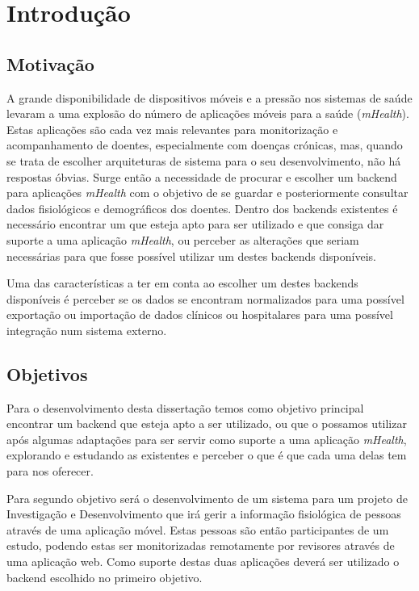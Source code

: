 \chapter{Introdu\c c\~ao}

\section{Motivação}

A grande disponibilidade de dispositivos móveis e a pressão nos sistemas de saúde levaram a uma explosão do número de aplicações móveis para a saúde (\textit{mHealth}). Estas aplicações são cada vez mais relevantes para monitorização e acompanhamento de doentes, especialmente com doenças crónicas, mas, quando se trata de escolher arquiteturas de sistema para o seu desenvolvimento, não há respostas óbvias. Surge então a necessidade de procurar e escolher um backend para aplicações \textit{mHealth} com o objetivo de se guardar e posteriormente consultar dados fisiológicos e demográficos dos doentes.
Dentro dos backends existentes é necessário encontrar um que esteja apto para ser utilizado e que consiga dar suporte a uma aplicação \textit{mHealth}, ou perceber as alterações que seriam necessárias para que fosse possível utilizar um destes backends disponíveis.\par
Uma das características a ter em conta ao escolher um destes backends disponíveis é perceber se os dados se encontram normalizados para uma possível exportação ou importação de dados clínicos ou hospitalares para uma possível integração num sistema externo.

\section{Objetivos}
Para o desenvolvimento desta dissertação temos como objetivo principal encontrar um backend que esteja apto a ser utilizado, ou que o possamos utilizar após algumas adaptações para ser servir como suporte a uma aplicação \textit{mHealth}, explorando e estudando as existentes e perceber o que é que cada uma delas tem para nos oferecer. \par
Para segundo objetivo será o desenvolvimento de um sistema para um projeto de Investigação e Desenvolvimento que irá gerir a informação fisiológica de pessoas através de uma aplicação móvel. Estas pessoas são então participantes de um estudo, podendo estas ser monitorizadas remotamente por revisores através de uma aplicação web. Como suporte destas duas aplicações deverá ser utilizado o backend escolhido no primeiro objetivo.
\cleardoublepage